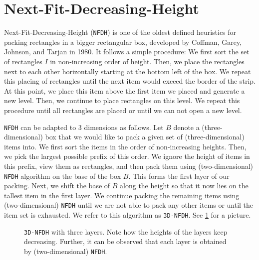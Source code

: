 \documentclass[10pt,a4paper]{amsart}
\newcommand{\NFDH}{\texttt{NFDH}\xspace}
\newcommand{\tNFDH}{\texttt{3D-NFDH}\xspace}
\theoremstyle{definition}
\begin{document}
\section{Next-Fit-Decreasing-Height}
\label{subsec:nfdh}
Next-Fit-Decreasing-Height (\NFDH) is one of the oldest defined heuristics for packing rectangles in a bigger rectangular box, 
developed by Coffman, Garey, Johnson, and Tarjan \cite{coffman1980performance} in 1980.
It follows a simple procedure: We first sort the set of rectangles $I$ in non-increasing order of height. Then, we place the rectangles next to each other horizontally starting at the bottom left of the box.  We repeat this placing of rectangles until the next item would exceed the border of the strip. At this point, we place this item above the first item we placed and generate a new level. Then, we continue to place rectangles on this level. We repeat this procedure until all rectangles are placed or until we can not open a new level.

\NFDH can be adapted to $3$ dimensions as follows. Let $B$ denote a (three-dimensional) box that we would like to pack a given set of (three-dimensional) items into.
We first sort the items in the order of non-increasing heights.
Then, we pick the largest possible prefix of this order. We ignore the height of items in this prefix,
view them as rectangles,
and then pack them using (two-dimensional) \NFDH algorithm on the base of the box $B$.
This forms the first layer of our packing. Next, we shift the base of
$B$ along the height so that it now lies on the tallest item in the first layer. We continue packing the remaining items using (two-dimensional) \NFDH until we are not able to pack any other items or 
until the item set is exhausted. We refer to this algorithm as \tNFDH. See \cref{fig:3d-nfdh} for a picture.

\begin{figure}
    \centering
    
    \caption{\tNFDH with three layers. Note how the heights of the layers keep decreasing. Further, it can be observed that each layer is obtained by (two-dimensional) \NFDH.}
    \label{fig:3d-nfdh}
\end{figure}
\end{document}
